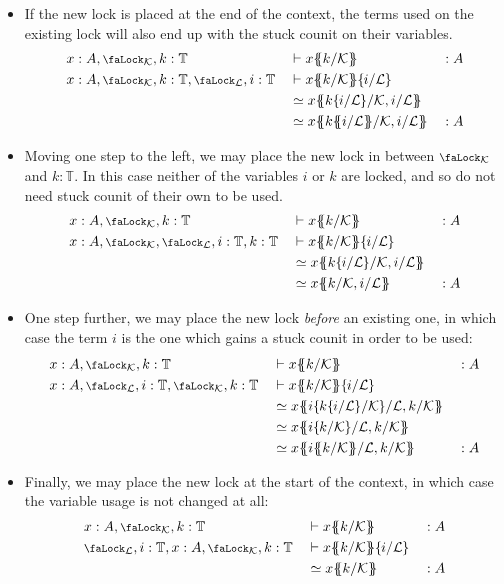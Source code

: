 \documentclass[10pt]{article}
\theoremstyle{definition}
\let\oldequiv\equiv%
\renewcommand{\equiv}{\simeq}
\newcommand{\defeq}{\oldequiv}
\newcommand{\yields}{\vdash}
\newcommand{\lock}{\mathchoice {\scalebox{0.8}{\text{\faLock}}}
  {\scalebox{0.8}{\text{\faLock}}} {\scalebox{0.5}{\text{\faLock}}}
  {\scalebox{0.4}{\text{\faLock}}} }
\newcommand{\Tiny}{\mathbb{T}}
\newcommand{\lockn}[1]{\mathcal{#1}}
\newcommand{\ctxlocke}[1]{\lock_{#1}}
\newcommand{\ctxlock}[1]{\ctxlocke{\lockn{#1}}}
\newcommand{\stubra}[1]{\{\!\!\{ #1 \}\!\!\}}
\newcommand{\admbra}[1]{\{\mkern-1mu #1 \mkern-0.5mu\}}
\newcommand{\subkeysep}[2]{#1/#2}
\newcommand{\subkeyo}[2]{\subkeysep{#1}{\lockn{#2}}}
\newcommand{\subkey}[2]{\admbra{\subkeyo{#1}{#2}}}
\newcommand{\substuck}[2]{\stubra{#1/\lockn{#2}}}
\begin{document}
\begin{itemize}
\item If the new lock is placed at the end of the context, the terms
  used on the existing lock will also end up with the stuck counit on
  their variables.
  \begin{alignat*}{3}
    &x : A,\ctxlock{K}, k : \Tiny
    &&\yields x\substuck{k}{K} &&: A \\
    &x : A,\ctxlock{K}, k : \Tiny, \ctxlock{L}, i : \Tiny
    &&\yields x\substuck{k}{K} \subkey{i}{L} \\
    &&&\defeq x\stubra{\subkeyo{k\subkey{i}{L}}{K}, \subkeyo{i}{L}}  \\
    &&&\defeq x\stubra{\subkeyo{k\substuck{i}{L}}{K}, \subkeyo{i}{L}} &&: A
  \end{alignat*}
\item Moving one step to the left, we may place the new lock in
  between $\ctxlock{K}$ and $k : \Tiny$. In this case neither of the
  variables $i$ or $k$ are locked, and so do not need stuck counit of
  their own to be used.
  \begin{alignat*}{3}
    &x : A, \ctxlock{K}, k : \Tiny
    &&\yields x\substuck{k}{K} &&: A \\
    &x : A, \ctxlock{K}, \ctxlock{L}, i : \Tiny, k : \Tiny
    &&\yields x\substuck{k}{K} \subkey{i}{L} \\
    &&&\defeq x\stubra{\subkeyo{k\subkey{i}{L}}{K}, \subkeyo{i}{L}}  \\
    &&&\defeq x\stubra{\subkeyo{k}{K}, \subkeyo{i}{L}} &&: A
  \end{alignat*}
\item One step further, we may place the new lock \emph{before} an
  existing one, in which case the term $i$ is the one which gains a
  stuck counit in order to be used:
  \begin{alignat*}{3}
    &x : A, \ctxlock{K}, k : \Tiny
    &&\yields x\substuck{k}{K} &&: A \\
    &x : A, \ctxlock{L}, i : \Tiny, \ctxlock{K}, k : \Tiny
    &&\yields x\substuck{k}{K} \subkey{i}{L} \\
    &&&\defeq x\stubra{\subkeyo{i\subkey{k\subkey{i}{L}}{K}}{L}, \subkeyo{k}{K}} \\
    &&&\defeq x\stubra{\subkeyo{i\subkey{k}{K}}{L}, \subkeyo{k}{K}} \\
    &&&\defeq x\stubra{\subkeyo{i\substuck{k}{K}}{L}, \subkeyo{k}{K}} &&: A
  \end{alignat*}
\item Finally, we may place the new lock at the start of the context,
  in which case the variable usage is not changed at all:
  \begin{alignat*}{3}
    &x : A, \ctxlock{K}, k : \Tiny
    &&\yields x\substuck{k}{K} &&: A \\
    &\ctxlock{L}, i : \Tiny, x : A, \ctxlock{K}, k : \Tiny
    &&\yields x\substuck{k}{K} \subkey{i}{L} \\
    &&&\defeq x\substuck{k}{K} &&: A
  \end{alignat*}
\end{itemize}
\end{document}
